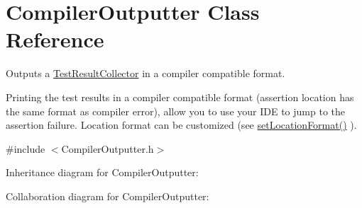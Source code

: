 \hypertarget{class_compiler_outputter}{\section{Compiler\+Outputter Class Reference}
\label{class_compiler_outputter}
}


Outputs a \hyperlink{class_test_result_collector}{Test\+Result\+Collector} in a compiler compatible format.

Printing the test results in a compiler compatible format (assertion location has the same format as compiler error), allow you to use your I\+D\+E to jump to the assertion failure. Location format can be customized (see \hyperlink{class_compiler_outputter_a0d9e67c7bdcb443b0b2754d61a10790c}{set\+Location\+Format()} ).  




{\ttfamily \#include $<$Compiler\+Outputter.\+h$>$}



Inheritance diagram for Compiler\+Outputter\+:


Collaboration diagram for Compiler\+Outputter\+:
